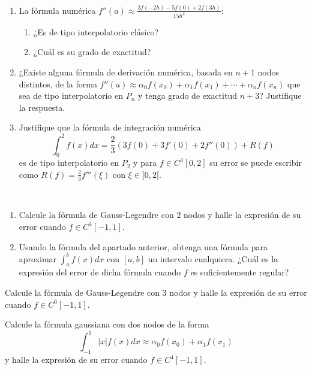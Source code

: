 \begin{ejercicio}\label{ej:2.1.22}~
    \begin{enumerate}
        \item La fórmula numérica $f''(a) \approx \frac{3f(-2h) - 5f(0) + 2f(3h)}{15h^2}$:
        \begin{enumerate}
            \item ¿Es de tipo interpolatorio clásico?
            \item ¿Cuál es su grado de exactitud?
        \end{enumerate}
        \item ¿Existe alguna fórmula de derivación numérica, basada en $n + 1$ nodos distintos, de la forma $f''(a) \approx \alpha_0 f(x_0) + \alpha_1 f(x_1) + \cdots + \alpha_n f(x_n)$ que sea de tipo interpolatorio en $P_n$ y tenga grado de exactitud $n + 3$? Justifique la respuesta.
        \item Justifique que la fórmula de integración numérica $$\int_{0}^{2} f(x) dx = \frac{2}{3} (3f(0) + 3f'(0) + 2f''(0)) + R(f)$$ es de tipo interpolatorio en $P_2$ y para $f \in C^3[0, 2]$ su error se puede escribir como $R(f) = \frac{2}{3} f'''(\xi)$ con $\xi \in ]0, 2[$.
    \end{enumerate}
\end{ejercicio}

\begin{ejercicio}\label{ej:2.1.23}~
    \begin{enumerate}
        \item Calcule la fórmula de Gauss-Legendre con 2 nodos y halle la expresión de su error cuando $f \in C^4[-1, 1]$.
        \item Usando la fórmula del apartado anterior, obtenga una fórmula para aproximar $\int_{a}^{b} f(x) dx$ con $[a, b]$ un intervalo cualquiera. ¿Cuál es la expresión del error de dicha fórmula cuando $f$ es suficientemente regular?
    \end{enumerate}
\end{ejercicio}

\begin{ejercicio}\label{ej:2.1.24}
    Calcule la fórmula de Gauss-Legendre con 3 nodos y halle la expresión de su error cuando $f \in C^6[-1, 1]$.
\end{ejercicio}

\begin{ejercicio}\label{ej:2.1.25}
    Calcule la fórmula gaussiana con dos nodos de la forma $$\int_{-1}^{1} |x|f(x) dx \approx \alpha_0 f(x_0) + \alpha_1 f(x_1)$$ y halle la expresión de su error cuando $f \in C^4[-1, 1]$.
\end{ejercicio}

